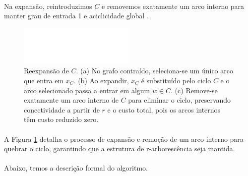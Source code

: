 \documentclass[12pt,a4paper]{article}
\begin{document}
\paragraph{}
Na expansão, reintroduzimos \(C\) e removemos exatamente um arco interno para manter grau de entrada 1 e aciclicidade global \cite{schrijver2003comb,kleinberg2006}.


\begin{figure}[H]
    \centering
    \includegraphics[width=0.9\linewidth]{figures/fig_chu_liu_reexpansion.pdf}

    \caption{Reexpansão de $C$. (a) No grafo contraído, seleciona-se um único arco que entra em $x_C$. (b) Ao expandir, $x_C$ é substituído pelo ciclo $C$ e o arco selecionado passa a entrar em algum $w\in C$. (c) Remove-se exatamente um arco interno de $C$ para eliminar o ciclo, preservando conectividade a partir de $r$ e o custo total, pois os arcos internos têm custo reduzido zero.}
    \label{fig:chu-liu-reexpansion}\end{figure}


\paragraph{}
A Figura \ref{fig:chu-liu-reexpansion} detalha o processo de expansão e remoção de um arco interno para quebrar o ciclo, garantindo que a estrutura de r-arborescência seja mantida.

\paragraph{}
Abaixo, temos a descrição formal do algoritmo.
\end{document}
